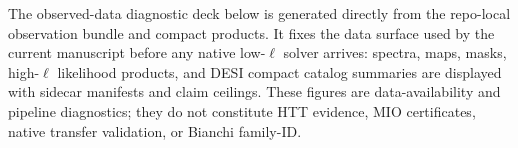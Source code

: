 


The observed-data diagnostic deck below is generated directly from the
repo-local observation bundle and compact products.  It fixes the data
surface used by the current manuscript before any native low-\(\ell\)
solver arrives: spectra, maps, masks, high-\(\ell\) likelihood products, and
DESI compact catalog summaries are displayed with sidecar manifests and
claim ceilings.  These figures are data-availability and pipeline diagnostics;
they do not constitute HTT evidence, MIO certificates, native transfer
validation, or Bianchi family-ID.




